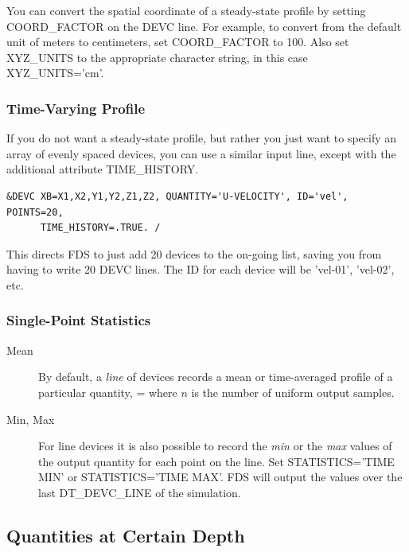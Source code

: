\documentclass[11pt]{book}
\begin{document}
You can convert the spatial coordinate of a steady-state profile by setting {\ct COORD\_FACTOR} on the {\ct DEVC} line. For example, to convert from the default unit of meters to centimeters, set {\ct COORD\_FACTOR} to 100. Also set {\ct XYZ\_UNITS} to the appropriate character string, in this case {\ct XYZ\_UNITS='cm'}.

\subsubsection{Time-Varying Profile}

If you do not want a steady-state profile, but rather you just want to specify an array of evenly spaced devices, you can use a similar input line, except with the additional attribute {\ct TIME\_HISTORY}.
\begin{lstlisting}
&DEVC XB=X1,X2,Y1,Y2,Z1,Z2, QUANTITY='U-VELOCITY', ID='vel', POINTS=20,
      TIME_HISTORY=.TRUE. /
\end{lstlisting}
This directs FDS to just add 20 devices to the on-going list, saving you from having to write 20 {\ct DEVC} lines. The {\ct ID} for each device will be {\ct 'vel-01'}, {\ct 'vel-02'}, etc.



\subsubsection{Single-Point Statistics}

\begin{description}
\item[Mean] By default, a {\em line} of devices records a mean or time-averaged profile of a particular quantity,
\be
   \overline{\phi} = 
\ee
where $n$ is the number of uniform output samples.

\item[Min, Max] For line devices it is also possible to record the \emph{min} or the \emph{max} values of the output quantity for each point on the line.  Set {\ct STATISTICS='TIME MIN'} or {\ct STATISTICS='TIME MAX'}.  FDS will output the values over the last {\ct DT\_DEVC\_LINE} of the simulation.
\end{description}


\subsection{Quantities at Certain Depth}
\label{info:DEPTH}
\end{document}
